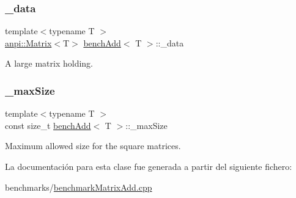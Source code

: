 \mbox{\label{classbenchAdd_afb4633add18175ba74873700d3c21261}} 
\subsubsection{\texorpdfstring{\+\_\+data}{\_data}}
{\footnotesize\ttfamily template$<$typename T $>$ \\
\hyperlink{classanpi_1_1Matrix}{anpi\+::\+Matrix}$<$T$>$ \hyperlink{classbenchAdd}{bench\+Add}$<$ T $>$\+::\+\_\+data\hspace{0.3cm}{\ttfamily [protected]}}



A large matrix holding. 

\mbox{\label{classbenchAdd_a65b40e28442f3cdabcfaa40054f26ce6}} 
\subsubsection{\texorpdfstring{\+\_\+max\+Size}{\_maxSize}}
{\footnotesize\ttfamily template$<$typename T $>$ \\
const size\+\_\+t \hyperlink{classbenchAdd}{bench\+Add}$<$ T $>$\+::\+\_\+max\+Size\hspace{0.3cm}{\ttfamily [protected]}}



Maximum allowed size for the square matrices. 



La documentación para esta clase fue generada a partir del siguiente fichero\+:\begin{DoxyCompactItemize}
\item 
benchmarks/\hyperlink{benchmarkMatrixAdd_8cpp}{benchmark\+Matrix\+Add.\+cpp}\end{DoxyCompactItemize}
